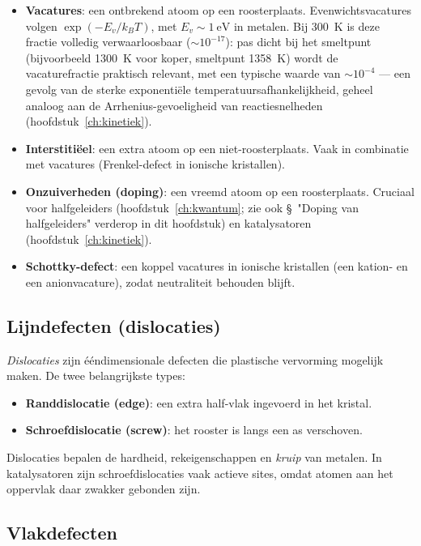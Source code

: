 \begin{itemize}
\item \textbf{Vacatures}: een ontbrekend atoom op een roosterplaats. Evenwichtsvacatures volgen $\exp(-E_v/k_BT)$, met $E_v \sim \SI{1}{\electronvolt}$ in metalen. Bij \SI{300}{\kelvin} is deze fractie volledig verwaarloosbaar ($\sim10^{-17}$): pas dicht bij het smeltpunt (bijvoorbeeld \SI{1300}{\kelvin} voor koper, smeltpunt \SI{1358}{\kelvin}) wordt de vacaturefractie praktisch relevant, met een typische waarde van $\sim10^{-4}$ --- een gevolg van de sterke exponenti\"ele temperatuursafhankelijkheid, geheel analoog aan de Arrhenius-gevoeligheid van reactiesnelheden (hoofdstuk~\ref{ch:kinetiek}).
\item \textbf{Interstiti\"eel}: een extra atoom op een niet-roosterplaats. Vaak in combinatie met vacatures (Frenkel-defect in ionische kristallen).
\item \textbf{Onzuiverheden (doping)}: een vreemd atoom op een roosterplaats. Cruciaal voor halfgeleiders (hoofdstuk~\ref{ch:kwantum}; zie ook \S~"Doping van halfgeleiders" verderop in dit hoofdstuk) en katalysatoren (hoofdstuk~\ref{ch:kinetiek}).
\item \textbf{Schottky-defect}: een koppel vacatures in ionische kristallen (een kation- en een anionvacature), zodat neutraliteit behouden blijft.
\end{itemize}

\subsection{Lijndefecten (dislocaties)}

\emph{Dislocaties} zijn \'e\'endimensionale defecten die plastische vervorming mogelijk maken. De twee belangrijkste types:
\begin{itemize}
\item \textbf{Randdislocatie (edge)}: een extra half-vlak ingevoerd in het kristal.
\item \textbf{Schroefdislocatie (screw)}: het rooster is langs een as verschoven.
\end{itemize}
Dislocaties bepalen de hardheid, rekeigenschappen en \emph{kruip} van metalen. In katalysatoren zijn schroefdislocaties vaak actieve sites, omdat atomen aan het oppervlak daar zwakker gebonden zijn.

\subsection{Vlakdefecten}

